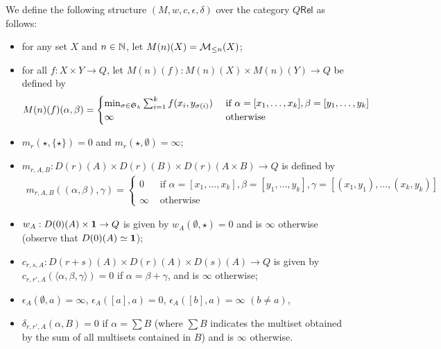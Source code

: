 \begin{definition}
We define the following structure $(M,w,c,\epsilon,\delta)$ over the category $Q\mathsf{Rel}$ as follows:
\begin{itemize}
\item for any set $X$ and $n\in \mathbb{N}$, let $M(n)(X)=\mathcal{M}_{\leq n}(X)$;

\item for all $f: X\times Y\to Q$, let $M(n)(f): M(n)(X)\times M(n)(Y)\to Q$ be defined by 
\begin{align*}
M(n)(f)(\alpha,\beta)=
\begin{cases}
\min_{\sigma\in \mathfrak{S}_{k}}\sum_{i=1}^{k}f(x_{i},y_{\sigma(i)}) & 
\text{ if }\alpha=[x_{1},\dots, x_{k}], \beta=[y_{1},\dots, y_{k}]\\
\infty & \text{ otherwise}
\end{cases}
\end{align*}


\item $m_{r}(\star, \{\star\})=0$ and $m_{r}(\star, \emptyset)=\infty$;

\item $m_{r,A,B}: D(r)(A)\times D(r)(B)\times D(r)(A\times B)\to Q$ is defined by 
\begin{align*}
m_{r,A,B}((\alpha,\beta), \gamma)=
\begin{cases}
0 & \text{ if } \alpha=[x_{1},\dots, x_{k}], \beta=[y_{1},\dots, y_{k}], \gamma= [(x_{1},y_{1}),\dots, (x_{k},y_{k})]\\
\infty & \text{ otherwise}
\end{cases}
\end{align*}

\item $w_{A}:D(0)(A)\times \mathbf{1}\to Q$ is given by $w_{A}(\emptyset, \star)=0$ and is $\infty$ otherwise (observe that $D(0)(A)\simeq \mathbf{1}$);

\item $c_{r,s,A}: D(r+s)(A)\times D(r)(A)\times D(s)(A)\to Q$ is given by $c_{r,r',A}(\langle\alpha, \beta,\gamma\rangle)=0$ if $\alpha=\beta+\gamma$, and is $\infty$ otherwise;

\item $\epsilon_{A}(\emptyset, a)=\infty$, $\epsilon_{A}([a],a)=0$, $\epsilon_{A}([b],a)=\infty$ $(b\neq a)$,

\item $\delta_{r,r',A}(\alpha, B)=0$ if $\alpha= \sum B$ (where $\sum B$ indicates the multiset obtained by the sum of all multisets contained in $B$) and is $\infty$ otherwise.




\end{itemize}

\end{definition}



